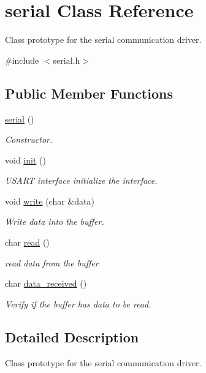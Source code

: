 \hypertarget{classserial}{\section{serial Class Reference}
\label{classserial}
}


Class prototype for the serial communication driver.  




{\ttfamily \#include $<$serial.\-h$>$}

\subsection*{Public Member Functions}
\begin{DoxyCompactItemize}
\item 
\hyperlink{classserial_af83de4f3ce9a1973df8c4d93358d6d2d}{serial} ()
\begin{DoxyCompactList}\small\item\em Constructor. \end{DoxyCompactList}\item 
void \hyperlink{classserial_a88bfeee91e14e29f5f2c8320af9bd1e0}{init} ()
\begin{DoxyCompactList}\small\item\em U\-S\-A\-R\-T interface initialize the interface. \end{DoxyCompactList}\item 
void \hyperlink{classserial_a9efa7dcc711a57c00c8b9920b23af62a}{write} (char \&data)
\begin{DoxyCompactList}\small\item\em Write data into the buffer. \end{DoxyCompactList}\item 
char \hyperlink{classserial_a4f99752cdd3b4fbb68365ff9d042a220}{read} ()
\begin{DoxyCompactList}\small\item\em read data from the buffer \end{DoxyCompactList}\item 
char \hyperlink{classserial_a34ffa5cf25bcf6c54a15e7237ea43e12}{data\-\_\-received} ()
\begin{DoxyCompactList}\small\item\em Verify if the buffer has data to be read. \end{DoxyCompactList}\end{DoxyCompactItemize}


\subsection{Detailed Description}
Class prototype for the serial communication driver. 

